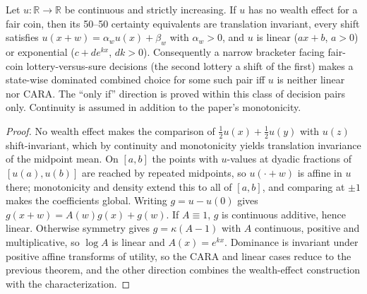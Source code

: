 \begin{theorem}
\label{thm:beh-rw-iff}
\leanok
Let $u:\mathbb R\to\mathbb R$ be continuous and strictly increasing. If $u$ has no wealth effect for a fair coin, then its
50--50 certainty equivalents are translation invariant, every shift satisfies $u(x+w)=\alpha_w u(x)+\beta_w$ with
$\alpha_w>0$, and $u$ is linear ($ax+b$, $a>0$) or exponential ($c+de^{kx}$, $dk>0$). Consequently a narrow bracketer
facing fair-coin lottery-versus-sure decisions (the second lottery a shift of the first) makes a state-wise dominated
combined choice for some such pair iff $u$ is neither linear nor CARA. The ``only if'' direction is proved within this
class of decision pairs only. Continuity is assumed in addition to the paper's monotonicity.
\end{theorem}
\begin{proof}
\leanok
No wealth effect makes the comparison of $\tfrac12 u(x)+\tfrac12 u(y)$ with $u(z)$ shift-invariant, which by continuity
and monotonicity yields translation invariance of the midpoint mean. On $[a,b]$ the points with $u$-values at dyadic
fractions of $[u(a),u(b)]$ are reached by repeated midpoints, so $u(\cdot+w)$ is affine in $u$ there; monotonicity and
density extend this to all of $[a,b]$, and comparing at $\pm1$ makes the coefficients global. Writing $g=u-u(0)$ gives
$g(x+w)=A(w)g(x)+g(w)$. If $A\equiv1$, $g$ is continuous additive, hence linear. Otherwise symmetry gives
$g=\kappa(A-1)$ with $A$ continuous, positive and multiplicative, so $\log A$ is linear and $A(x)=e^{kx}$. Dominance is
invariant under positive affine transforms of utility, so the CARA and linear cases reduce to the previous theorem, and
the other direction combines the wealth-effect construction with the characterization.
\end{proof}

